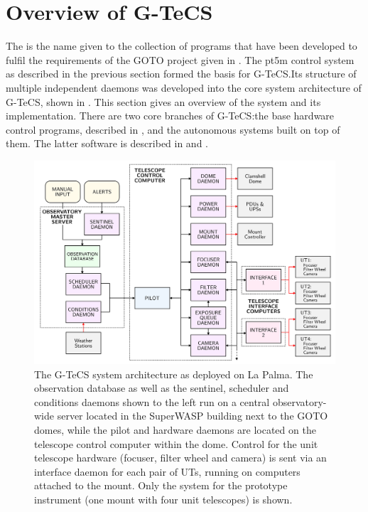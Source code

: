 \section{Overview of G-TeCS}
\label{sec:gtecs}
\begin{colsection}


\begin{colsection}

The  is the name given to the collection of programs that have been developed to fulfil the requirements of the GOTO project given in . The pt5m control system as described in the previous section formed the basis for G-TeCS.\@ Its structure of multiple independent daemons was developed into the core system architecture of G-TeCS, shown in . This section gives an overview of the system and its implementation. There are two core branches of G-TeCS:\@ the base hardware control programs, described in , and the autonomous systems built on top of them. The latter software is described in  and .

\begin{figure}[p]
    \begin{center}
        \includegraphics[width=\linewidth]{images/flow.pdf}
    \end{center}
    \caption[The G-TeCS system architecture]{
        The G-TeCS system architecture as deployed on La Palma. The observation database as well as the sentinel, scheduler and conditions daemons shown to the left run on a central observatory-wide server located in the SuperWASP building next to the GOTO domes, while the pilot and hardware daemons are located on the telescope control computer within the dome. Control for the unit telescope hardware (focuser, filter wheel and camera) is sent via an interface daemon for each pair of UTs, running on computers attached to the mount. Only the system for the prototype instrument (one mount with four unit telescopes) is shown.
    }\label{fig:flow}
\end{figure}


\end{colsection}
\end{colsection}
